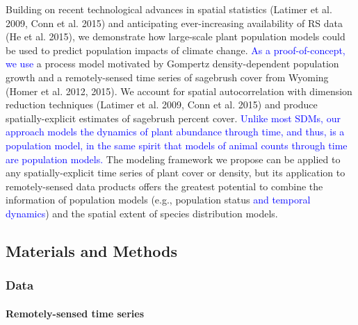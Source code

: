 \documentclass[12pt,]{article}
\let\oldparagraph\paragraph
\renewcommand{\paragraph}[1]{\oldparagraph{#1}\mbox{}}
\begin{document}
Building on recent technological advances in spatial statistics (Latimer
et al. 2009, Conn et al. 2015) and anticipating ever-increasing
availability of RS data (He et al. 2015), we demonstrate how large-scale
plant population models could be used to predict population impacts of
climate change. \textcolor{blue}{As a proof-of-concept, we use} a
process model motivated by Gompertz density-dependent population growth
and a remotely-sensed time series of sagebrush cover from Wyoming (Homer
et al. 2012, 2015). We account for spatial autocorrelation with
dimension reduction techniques (Latimer et al. 2009, Conn et al. 2015)
and produce spatially-explicit estimates of sagebrush percent cover.
\textcolor{blue}{Unlike most SDMs, our approach models the dynamics of plant abundance through time, and thus, is a population model, in the same spirit that models of animal counts through time are population models.}
The modeling framework we propose can be applied to any
spatially-explicit time series of plant cover or density, but its
application to remotely-sensed data products offers the greatest
potential to combine the information of population models (e.g.,
population status \textcolor{blue}{and temporal dynamics}) and the
spatial extent of species distribution models.

\subsection{Materials and Methods}\label{materials-and-methods}

\subsubsection{Data}\label{data}

\paragraph{Remotely-sensed time
series}\label{remotely-sensed-time-series}
\end{document}
